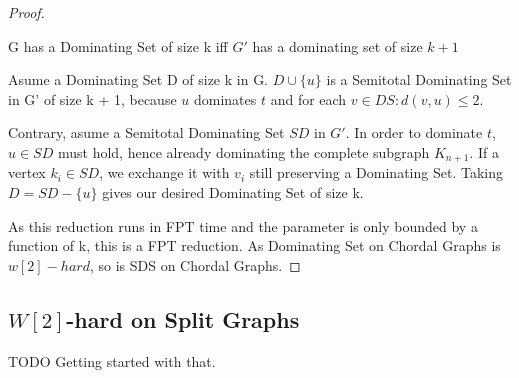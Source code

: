 \begin{proof}
    \begin{corollary}
    G has a Dominating Set of size k iff $G'$ has a dominating set of size $k+1$
    \end{corollary}
    \begin{subproof}
    Asume a Dominating Set D of size k in G. $D \cup \{u\}$ is a Semitotal Dominating Set in G' of size k + 1, because $u$ dominates $t$ and for each $v \in DS: d(v, u) \leq 2$.

    Contrary, asume a Semitotal Dominating Set $SD$ in $G'$. In order to dominate $t$, $u \in SD$ must hold, hence already dominating the complete subgraph $K_{n+1}$. If a vertex $k_i \in SD$, we exchange it with $v_i$ still preserving a Dominating Set. Taking $D = SD - \{ u \}$ gives our desired Dominating Set of size k.
    \end{subproof}
    As this reduction runs in FPT time and the parameter is only bounded by a function of k, this is a FPT reduction. As Dominating Set on Chordal Graphs is $w[2]-hard$, so is SDS on Chordal Graphs.

\end{proof}

\subsection{\hmath $W[2]$-hard on Split Graphs}

TODO Getting started with that.